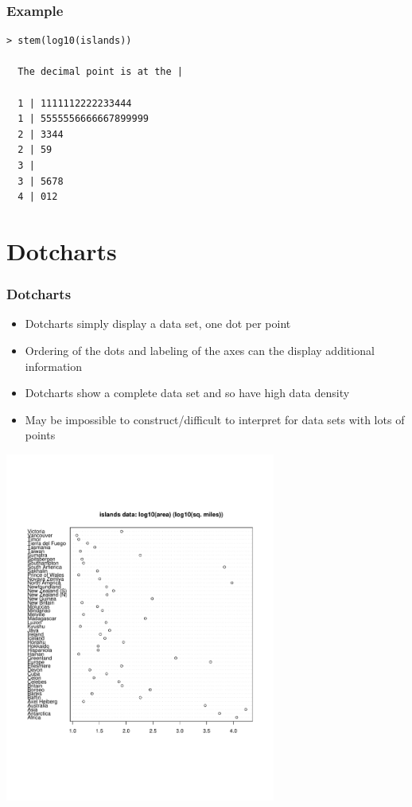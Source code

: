 \documentclass[aspectratio=169]{beamer}
\begin{document}
\begin{frame}[fragile]\frametitle{Example}
\begin{verbatim}
> stem(log10(islands))

  The decimal point is at the |

  1 | 1111112222233444
  1 | 5555556666667899999
  2 | 3344
  2 | 59
  3 | 
  3 | 5678
  4 | 012
\end{verbatim}
\end{frame}

\section{Dotcharts}
\begin{frame}\frametitle{Dotcharts}
\begin{itemize}
\item Dotcharts simply display a data set, one dot per point
\item Ordering of the dots and labeling of the axes
  can the display additional information
\item Dotcharts show a complete data set and so have high
  data density
\item May be impossible to construct/difficult to interpret
  for data sets with lots of points
\end{itemize}
\end{frame}

\begin{frame}
\includegraphics[width=3.5in]{dotChart.pdf}
\end{frame}
\end{document}
